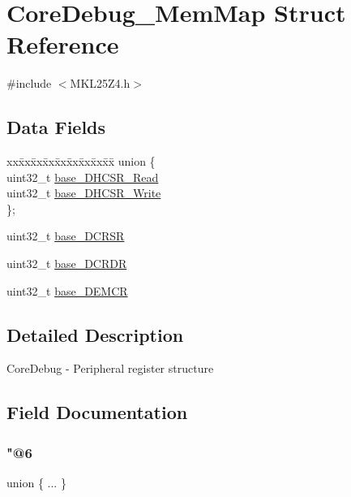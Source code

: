 \hypertarget{struct_core_debug___mem_map}{}\section{Core\+Debug\+\_\+\+Mem\+Map Struct Reference}
\label{struct_core_debug___mem_map}


{\ttfamily \#include $<$M\+K\+L25\+Z4.\+h$>$}

\subsection*{Data Fields}
\begin{DoxyCompactItemize}
\item 
\begin{tabbing}
xx\=xx\=xx\=xx\=xx\=xx\=xx\=xx\=xx\=\kill
union \{\\
\>uint32\_t \hyperlink{struct_core_debug___mem_map_af7ac245a8dc5badd325e2a79d5e926b5}{base\_DHCSR\_Read}\\
\>uint32\_t \hyperlink{struct_core_debug___mem_map_a033962700f14389a6ecb3282097e4308}{base\_DHCSR\_Write}\\
\}; \\

\end{tabbing}\item 
uint32\+\_\+t \hyperlink{struct_core_debug___mem_map_a982469115dfee452a1011a5ca1258911}{base\+\_\+\+D\+C\+R\+SR}
\item 
uint32\+\_\+t \hyperlink{struct_core_debug___mem_map_a24117c992f237c14f50718450adf91be}{base\+\_\+\+D\+C\+R\+DR}
\item 
uint32\+\_\+t \hyperlink{struct_core_debug___mem_map_a61a7cec8c03ae8b9fd1c90193ebe1f9f}{base\+\_\+\+D\+E\+M\+CR}
\end{DoxyCompactItemize}


\subsection{Detailed Description}
Core\+Debug -\/ Peripheral register structure 

\subsection{Field Documentation}
\mbox{\label{struct_core_debug___mem_map_a7b20a01f17183403f07739a253ec1467}} 
\subsubsection{\texorpdfstring{"@6}{@6}}
{\footnotesize\ttfamily union \{ ... \} }

